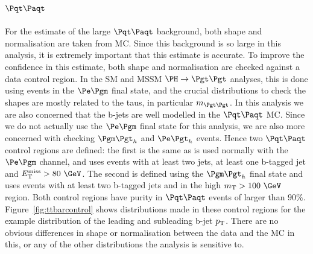 \subsection{$\ttbar$}

For the estimate of the large $\ttbar$ background, both shape and normalisation
are taken from \ac{MC}. Since this background is so large in this analysis, it
is extremely important that this estimate is accurate. To improve the confidence
in this estimate, both shape and normalisation are checked against a data
control region. In the \ac{SM} and \ac{MSSM} $\HToTauTau$ analyses, this is done
using events in the $\emu$ final state, and the crucial distributions to check
the shapes are mostly related to the taus, in particular $m_{\Pgt\Pgt}$. In this
analysis we are also concerned that the b-jets are well modelled in the
$\ttbar$ \ac{MC}. Since we do not actually use the $\emu$ final state for this
analysis, we are also more concerned with checking $\mutau$ and $\etau$ events.
Hence two $\ttbar$ control regions are defined: the first is the same as is used
normally with the $\emu$ channel, and uses events with at least two jets, at least
one b-tagged jet and $\MET>80~\GeV$. The second is defined using the
$\mutau$ final state and uses events with at least two b-tagged jets and in the
high $m_{\text{T}}>100~\GeV$ region. Both control regions have purity in
$\ttbar$ events of larger than $90\%$. Figure~\ref{fig:ttbarcontrol} shows
distributions made in these control regions for the example distribution of the
leading and subleading b-jet $p_{\mathrm{T}}$. There are no obvious differences in shape or
normalisation between the data and the \ac{MC} in this, or any of the other
distributions the analysis is sensitive to.

